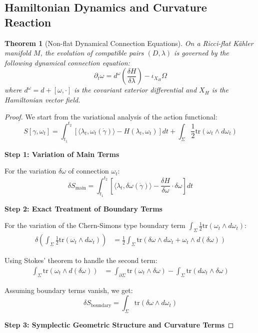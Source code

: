 \documentclass[a4paper,12pt]{extarticle}
\newtheorem{theorem}{Theorem}
\theoremstyle{definition}
\begin{document}
\subsection{Hamiltonian Dynamics and Curvature Reaction}

\begin{theorem}[Non-flat Dynamical Connection Equations]
On a Ricci-flat Kähler manifold $M$, the evolution of compatible pairs $(D, \lambda)$ is governed by the following dynamical connection equation:
$$\partial_t \omega = d^\omega\left(\frac{\delta H}{\delta \lambda}\right) - \iota_{X_H} \Omega$$
where $d^\omega = d + [\omega, \cdot]$ is the covariant exterior differential and $X_H$ is the Hamiltonian vector field.
\end{theorem}

\begin{proof}
We start from the variational analysis of the action functional:
$$S[\gamma, \omega_t] = \int_{t_1}^{t_2} \left[\langle\lambda_t, \omega_t(\dot{\gamma})\rangle - H(\lambda_t, \omega_t)\right] dt + \int_\Sigma \frac{1}{2}\text{tr}(\omega_t \wedge d\omega_t)$$

\textbf{Step 1: Variation of Main Terms}

For the variation $\delta\omega$ of connection $\omega_t$:
$$\delta S_{\text{main}} = \int_{t_1}^{t_2} \left[\langle\lambda_t, \delta\omega(\dot{\gamma})\rangle - \frac{\delta H}{\delta \omega} \cdot \delta\omega\right] dt$$

\textbf{Step 2: Exact Treatment of Boundary Terms}

For the variation of the Chern-Simons type boundary term $\int_\Sigma \frac{1}{2}\text{tr}(\omega_t \wedge d\omega_t)$:
\begin{align}
\delta\left(\int_\Sigma \frac{1}{2}\text{tr}(\omega_t \wedge d\omega_t)\right) &= \frac{1}{2}\int_\Sigma \text{tr}(\delta\omega \wedge d\omega_t + \omega_t \wedge d(\delta\omega))
\end{align}

Using Stokes' theorem to handle the second term:
\begin{align}
\int_\Sigma \text{tr}(\omega_t \wedge d(\delta\omega)) &= \int_{\partial\Sigma} \text{tr}(\omega_t \wedge \delta\omega) - \int_\Sigma \text{tr}(d\omega_t \wedge \delta\omega)
\end{align}

Assuming boundary terms vanish, we get:
$$\delta S_{\text{boundary}} = \int_\Sigma \text{tr}(\delta\omega \wedge d\omega_t)$$

\textbf{Step 3: Symplectic Geometric Structure and Curvature Terms}


\end{proof}
\end{document}
